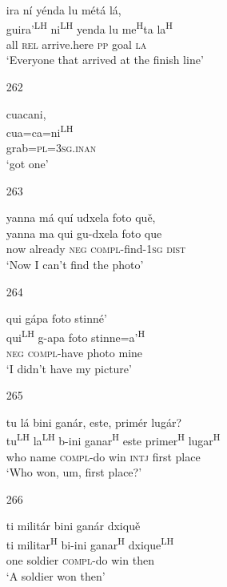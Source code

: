 \begin{itemize}
\glll   ira n\'{i} y\'{e}nda lu m\'{e}t\'{a} l\'{a}, \\
guira'\textsuperscript{LH} ni\textsuperscript{LH} yenda lu me\textsuperscript{H}ta la\textsuperscript{H}\\
all \textsc{rel} arrive.here \textsc{pp} goal \textsc{la}\\
\glt `Everyone that arrived at the finish line'
 


\item[262]
 
\glll   cuacani, \\
cua=ca=ni\textsuperscript{LH}\\
grab=\textsc{pl}=\textsc{3sg.inan}\\
\glt `got one'
 


\item[263]
 
\glll   yanna m\'{a} qu\'{i} udxela foto qu\v{e},\\
yanna ma qui gu-dxela foto que\\
now already \textsc{neg} \textsc{compl}-find-\textsc{1sg} \textsc{dist}\\
\glt `Now I can't find the photo'
 


\item[264]
 
\glll   qui g\'{a}pa foto stinn\'{e}'\\
qui\textsuperscript{LH} g-apa foto stinne=a'\textsuperscript{H}\\
\textsc{neg} \textsc{compl}-have photo mine\\
\glt `I didn't have my picture'
 



\item[265]

\glll tu l\'{a} bini gan\'{a}r, este, prim\'{e}r lug\'{a}r?\\
tu\textsuperscript{LH} la\textsuperscript{LH} b-ini ganar\textsuperscript{H} este primer\textsuperscript{H} lugar\textsuperscript{H}\\
who name \textsc{compl}-do win \textsc{intj} first place \\
\glt `Who won, um, first place?'


\item[266]

\glll ti milit\'{a}r bini gan\'{a}r dxiqu\v{e}\\
ti militar\textsuperscript{H} bi-ini ganar\textsuperscript{H} dxique\textsuperscript{LH}\\
one soldier \textsc{compl}-do win then\\
\glt `A soldier won then' 





\end{itemize}
